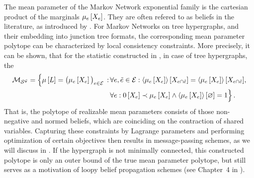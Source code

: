 The mean parameter of the Markov Network exponential family is the cartesian product of the marginals $\mu_{e}\left[X_{e}\right]$.
They are often refered to as beliefs in the literature, as introduced by \cite{pearl_probabilistic_1988}.
For Markov Networks on tree hypergraphs, and their embedding into junction tree formats, the corresponding mean parameter polytope can be characterized by local consistency constraints.
More precisely, it can be shown, that for the statistic constructed in , in case of tree hypergraphs, the
\begin{align*}
    \mathcal{M}_{\mathcal{S}^{\mathcal{G}}}
    = \Big\{ \mu\left[L\right]=\big(\mu_{e}\left[X_{e}\right]\big)_{e\in\mathcal{E}} \, : \,
    & \forall{e,\tilde{e}\in\mathcal{E}}:{
        \left\langle \mu_{e}\left[X_{e}\right]\right\rangle \left[ X_{e\cap\tilde{e}} \right] = \left\langle \mu_{e}\left[X_{e}\right]\right\rangle \left[ X_{e\cap\tilde{e}} \right]}, \\
    & \forall{e}:{0\left[X_{e}\right] \prec \mu_{e}\left[X_{e}\right] \land \left\langle \mu_{e}\left[X_{e}\right]\right\rangle \left[ \varnothing \right]=1} \Big\} \, .
\end{align*}
That is, the polytope of realizable mean parameters consists of those non-negative and normed beliefs, which are coinciding on the contraction of shared variables.
Capturing these constraints by Lagrange parameters and performing optimization of certain objectives then results in message-passing schemes, as we will discuss in .
If the hypergraph is not minimally connected, this constructed polytope is only an outer bound of the true mean parameter polytope, but still serves as a motivation of loopy belief propagation schemes (see Chapter~4 in \cite{wainwright_graphical_2008}).




\label{sec:mintermExpFamily}

